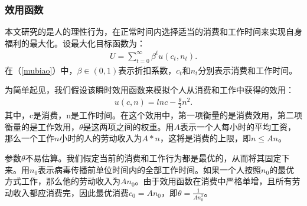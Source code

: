 \subsubsection{效用函数}
本文研究的是人的理性行为，在正常时间内选择适当的消费和工作时间来实现自身福利的最大化。设最大化目标函数为：
\begin{align}\label{mubiao}
    U = \sum_{t=0}^{\infty} \beta^t u(c_t,n_t).
\end{align}
在（\ref{mubiao}）中，$\beta \in (0,1)$表示折扣系数，$c_t$和$n_t$分别表示消费和工作时间。

为简单起见，我们假设该瞬时效用函数来模拟个人从消费和工作中获得的效用：
\begin{align}
    u(c,n) = lnc - \frac{\theta}{2} n^2.
\end{align}
其中，c是消费，n是工作时间。在这个效用中，第一项衡量的是消费效用，第二项衡量的是工作效用，$\theta$是这两项之间的权重。用$A$表示一个人每小时的平均工资，那么一个工作$n$小时的人的劳动收入为$A*n$，这将是消费的上限，即$n\leq An$。

参数$\theta$不易估算。我们假定当前的消费和工作行为都是最优的，从而将其固定下来。用$n_0$表示病毒传播前单位时间内的全部工作时间。如果一个人按照$n_0$的最优方式工作，那么他的劳动收入为$An_0$。由于效用函数在消费中严格单增，且所有劳动收入都应消费完，因此最优消费$c_0=An_0$，即$\theta = \frac{1}{An_{0}^{2}}$。





